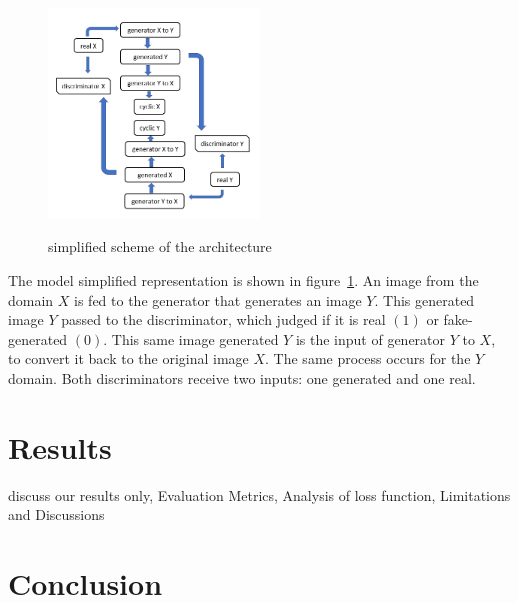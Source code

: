 \documentclass[]{IEEEtran}
\begin{document}
\begin{figure}[h]
\centering
\includegraphics[width=0.5\textwidth]{./images/flux.png}
\hspace{1mm}
\label{flux}
\caption{simplified scheme of the architecture} 
\end{figure}

The model simplified representation is shown in figure~\ref{flux}. An image from the domain $X$ is fed to the generator that generates an image $Y$. This generated image $Y$ passed to the discriminator, which judged if it is real $(1)$ or fake-generated $(0)$. This same image generated $Y$ is the input of generator $Y$ to $X$, to convert it back to the original image $X$. The same process occurs for the $Y$ domain. Both discriminators receive two inputs: one generated and one real.      


\section{Results}
discuss our results only, Evaluation Metrics, Analysis of loss function, Limitations and Discussions


\section{Conclusion}







 

\end{document}
